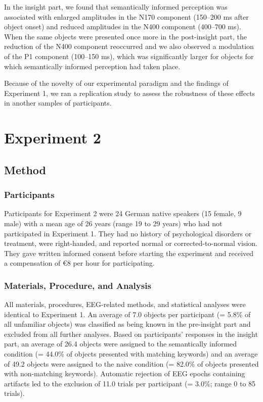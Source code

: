 \documentclass[
  english,
  doc,12pt,twoside,floatsintext]{apa7}
\begin{document}
In the insight part, we found that semantically informed perception was associated with enlarged amplitudes in the N170 component (150--200 ms after object onset) and reduced amplitudes in the N400 component (400--700 ms). When the same objects were presented once more in the post-insight part, the reduction of the N400 component reoccurred and we also observed a modulation of the P1 component (100--150 ms), which was significantly larger for objects for which semantically informed perception had taken place.

Because of the novelty of our experimental paradigm and the findings of Experiment 1, we ran a replication study to assess the robustness of these effects in another samples of participants.

\hypertarget{experiment-2}{%
\section{Experiment 2}\label{experiment-2}}

\hypertarget{method-1}{%
\subsection{Method}\label{method-1}}

\hypertarget{participants-1}{%
\subsubsection{Participants}\label{participants-1}}

Participants for Experiment 2 were 24 German native speakers (15 female, 9 male) with a mean age of 26 years (range 19 to 29 years) who had not participated in Experiment 1. They had no history of psychological disorders or treatment, were right-handed, and reported normal or corrected-to-normal vision. They gave written informed consent before starting the experiment and received a compensation of €8 per hour for participating.

\hypertarget{materials-procedure-and-analysis}{%
\subsubsection{Materials, Procedure, and Analysis}\label{materials-procedure-and-analysis}}

All materials, procedures, EEG-related methods, and statistical analyses were identical to Experiment 1. An average of 7.0 objects per participant (= 5.8\% of all unfamiliar objects) was classified as being known in the pre-insight part and excluded from all further analyses. Based on participants' responses in the insight part, an average of 26.4 objects were assigned to the semantically informed condition (= 44.0\% of objects presented with matching keywords) and an average of 49.2 objects were assigned to the naive condition (= 82.0\% of objects presented with non-matching keywords). Automatic rejection of EEG epochs containing artifacts led to the exclusion of 11.0 trials per participant (= 3.0\%; range 0 to 85 trials).
\end{document}
